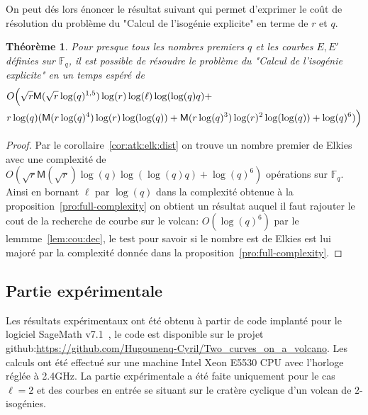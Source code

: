 \documentclass[10pt,a4paper]{book}
\theoremstyle{plain}
\newtheorem{thm}{Théorème}[chapter]
\theoremstyle{definition}
\theoremstyle{definition}
\theoremstyle{definition}
\theoremstyle{definition}
\theoremstyle{remark}
\theoremstyle{remark}
\theoremstyle{definition}
\begin{document}
On peut dés lors énoncer le résultat suivant qui permet d'exprimer le coût de 
résolution du problème du "Calcul de l'isogénie explicite" en terme de $r$ et $q$.

\begin{thm}
\label{thm:gen:elk:fin}
Pour presque tous les nombres premiers $q$ et les courbes $E,E'$ définies sur 
$\mathbb{F}_q$, il est possible de résoudre le problème du "Calcul de l'isogénie explicite" 
en un temps espéré de 
 \begin{equation*}
 \begin{alignedat}{1}
& O\Bigl(\sqrt{r}\mathsf{M}(\sqrt{r}\log(q)^{1,5})\log(r)\log(\ell)\log(\log(q) q) + \\ 
& r \log(q) (\mathsf{M}(r \log(q)^4) \log(r) \log(\log(q)) + \mathsf{M}(r \log(q)^3) \log(r)^2 \log(\log(q)) + \log(q)^6 )  \Bigr)
\end{alignedat}
 \end{equation*}
\end{thm}

\begin{proof}
Par le corollaire~\ref{cor:atk:elk:dist} on trouve un nombre premier de Elkies 
avec une complexité de $O(\sqrt{r}\mathsf{M}(\sqrt{r})\log(q)\log(\log(q) q)+\log(q)^6)$ 
opérations sur $\mathbb{F}_q$.
Ainsi en bornant $\ell$ par $\log(q)$ dans la complexité obtenue à la 
proposition~\ref{pro:full-complexity} on obtient un résultat auquel il faut 
rajouter le cout de la recherche de courbe sur le volcan: $O(\log(q)^6)$ par le 
lemmme~\ref{lem:cou:dec}, le test pour savoir si le nombre est de Elkies 
est lui majoré par la complexité donnée dans la 
proposition~\ref{pro:full-complexity}.
\end{proof}

\subsection{Partie expérimentale}
\label{ssec:exp:cou}

Les résultats expérimentaux ont été obtenu à partir de code implanté pour le 
logiciel SageMath v7.1~\cite{Sage}, le code est disponible sur le projet 
github:\url{https://github.com/Hugounenq-Cyril/Two_curves_on_a_volcano}. Les 
calculs ont été effectué sur une machine Intel Xeon E5530 CPU avec l'horloge 
réglée à 2.4GHz. La partie expérimentale a été faite uniquement pour le cas 
$\ell=2$ et des courbes en entrée se situant sur le cratère cyclique d'un 
volcan de $2$-isogénies.
\end{document}
